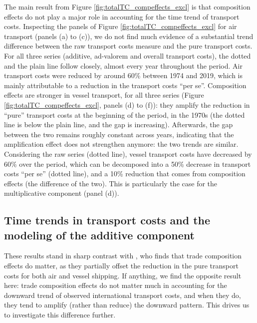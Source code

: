 \documentclass[a4paper,11pt]{article}
\begin{document}
The main result from Figure \ref{fig:totalTC_compeffects_excl} is that composition effects do not play a major role in accounting for the time trend of transport costs. Inspecting the panels of Figure \ref{fig:totalTC_compeffects_excl} for air transport (panels (a) to (c)), we do not find much evidence of a substantial trend difference between the raw transport costs measure and the pure transport costs.
For all three series (additive, ad-valorem and overall transport costs), the dotted and the plain line follow closely, almost every year throughout the period.
Air transport costs were reduced by around 60\% between 1974 and 2019, which is mainly attributable to a reduction in the transport costs ``per se''.
Composition effects are stronger in vessel transport, for all three series (Figure \ref{fig:totalTC_compeffects_excl}, panels (d) to (f)): they amplify the reduction in ``pure'' transport costs at the beginning of the period, in the 1970s (the dotted line is below the plain line, and the gap is increasing). Afterwards, the gap between the two remains roughly constant across years, indicating that the amplification effect does not strengthen anymore: the two trends are similar.
Considering the raw series (dotted line), vessel transport costs have decreased by 60\% over the period, which can be decomposed into a 50\% decrease in transport costs ``per se'' (dotted line), and a 10\% reduction that comes from composition effects (the difference of the two).
This is particularly the case for the multiplicative component (panel (d)).\smallskip


\subsection{Time trends in transport costs and the modeling of the additive component}

These results stand in sharp contrast with \cite{hummels2007}, who finds that trade composition effects do matter, as they partially offset the reduction in the pure transport costs for both air and vessel shipping. If anything, we find the opposite result here: trade composition effects do not matter much in accounting for the downward trend of observed international transport costs, and when they do, they tend to amplify (rather than reduce) the downward pattern. This drives us to investigate this difference further.
\end{document}
